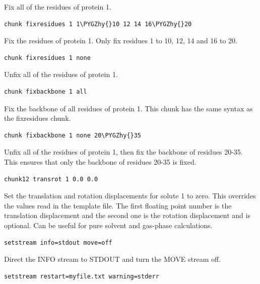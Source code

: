 \documentclass[letterpaper,10pt,english]{sphinxmanual}
\def\PYGZhy{\char`\-}
\begin{document}
Fix all of the residues of protein 1.

\begin{Verbatim}[commandchars=\\\{\}]
chunk fixresidues 1 1\PYGZhy{}10 12 14 16\PYGZhy{}20
\end{Verbatim}

Fix the residues of protein 1. Only fix residues 1 to 10, 12, 14 and 16 to 20.

\begin{Verbatim}[commandchars=\\\{\}]
chunk fixresidues 1 none
\end{Verbatim}

Unfix all of the residues of protein 1.

\begin{Verbatim}[commandchars=\\\{\}]
chunk fixbackbone 1 all
\end{Verbatim}

Fix the backbone of all residues of protein 1. This chunk has the same syntax as the fixresidues chunk.

\begin{Verbatim}[commandchars=\\\{\}]
chunk fixbackbone 1 none 20\PYGZhy{}35
\end{Verbatim}

Unfix all of the residues of protein 1, then fix the backbone of residues 20-35. This ensures that only the backbone of residues 20-35 is fixed.

\begin{Verbatim}[commandchars=\\\{\}]
chunk12 transrot 1 0.0 0.0
\end{Verbatim}

Set the translation and rotation displacements for solute 1 to zero. This overrides the values read in the template file. The first floating point number is the translation displacement and the second one is the rotation displacement and is optional. Can be useful for pure solvent and gas-phase calculations.

\begin{Verbatim}[commandchars=\\\{\}]
setstream info=stdout move=off
\end{Verbatim}

Direct the INFO stream to STDOUT and turn the MOVE stream off.

\begin{Verbatim}[commandchars=\\\{\}]
setstream restart=myfile.txt warning=stderr
\end{Verbatim}
\end{document}
